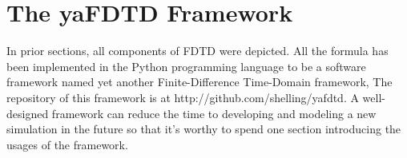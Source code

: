 \section{The yaFDTD Framework}

In prior sections, all components of FDTD were depicted. All the formula has been implemented in the Python programming
language to be a software framework named yet another Finite-Difference Time-Domain framework, The repository of this
framework is at http://github.com/shelling/yafdtd. A well-designed framework can reduce the time to developing and
modeling a new simulation in the future so that it's worthy to spend one section introducing the usages of the
framework.

